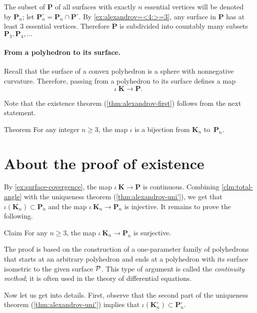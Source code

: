 The subset of $\bm{P}$ of all surfaces with exactly $n$ essential vertices will be denoted by $\bm{P}_n$; let $\bm{P}_n^\circ=\bm{P}_n\cap \bm{P}^\circ$.
By \ref{ex:alexandrov=<4:>=3}, any surface in $\bm{P}$ has at least 3 essential vertices.
Therefore $\bm{P}$ is subdivided into countably many subsets
 $\bm{P}_3,\bm{P}_4,\dots$

\paragraph{From a polyhedron to its surface.}
Recall that the surface of a convex polyhedron is a sphere with nonnegative curvature.
Therefore, passing from a polyhedron to its surface defines a map
\[\iota\:\bm{K}\to \bm{P}.\]

Note that the existence theorem (\ref{thm:alexandrov-first}) follows from the next statement.

\begin{thm}{Theorem}\label{thm:reformulation}
For any integer $n\ge 3$,
the map $\iota$ is a bijection from $\bm{K}_n$ to~$\bm{P}_n$.
\end{thm}

\section{About the proof of existence}

By \ref{ex:surface-covergence}, the map $\iota\:\bm{K}\to\bm{P}$ is continuous.
Combining \ref{clm:total-angle} with the uniqueness theorem (\ref{thm:alexandrov-uni'}), we get that $\iota(\bm{K}_n)\subset \bm{P}_n$ and the map $\iota\:\bm{K}_n\to\bm{P}_n$ is injective.
It remains to prove the following.

\begin{thm}{Claim}\label{clm:surjective}
For any $n\ge 3$, the map $\iota\:\bm{K}_n\to\bm{P}_n$ is surjective.
\end{thm}

The proof is based on the construction of a one-parameter family of polyhedrons that starts at an arbitrary polyhedron
and ends at a polyhedron with its surface isometric to the given surface $\mathcal{P}$.
This type of argument is called the \emph{continuity method}; it is often used in the theory of differential equations.

\medskip

Now let us get into details.
First, observe that the second part of the uniqueness theorem (\ref{thm:alexandrov-uni'}) implies that $\iota(\bm{K}_n^\circ)\subset \bm{P}_n^\circ$.

